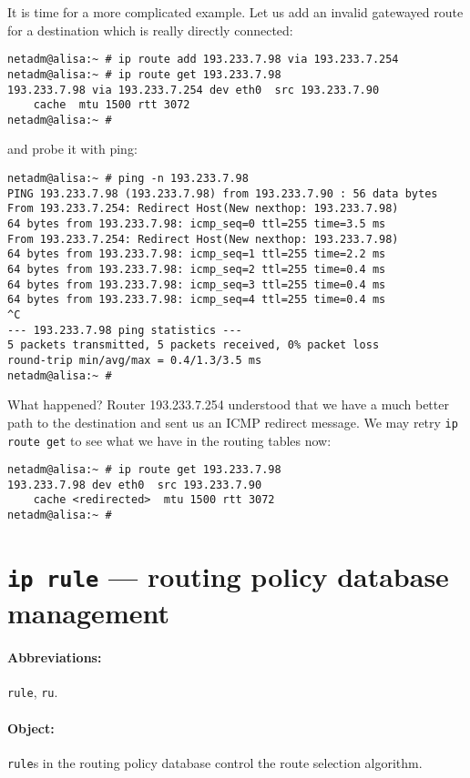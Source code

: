 It is time for a more complicated example. Let us add an invalid
gatewayed route for a destination which is really directly connected:
\begin{verbatim}
netadm@alisa:~ # ip route add 193.233.7.98 via 193.233.7.254
netadm@alisa:~ # ip route get 193.233.7.98
193.233.7.98 via 193.233.7.254 dev eth0  src 193.233.7.90
    cache  mtu 1500 rtt 3072
netadm@alisa:~ #
\end{verbatim}
and probe it with ping:
\begin{verbatim}
netadm@alisa:~ # ping -n 193.233.7.98
PING 193.233.7.98 (193.233.7.98) from 193.233.7.90 : 56 data bytes
From 193.233.7.254: Redirect Host(New nexthop: 193.233.7.98)
64 bytes from 193.233.7.98: icmp_seq=0 ttl=255 time=3.5 ms
From 193.233.7.254: Redirect Host(New nexthop: 193.233.7.98)
64 bytes from 193.233.7.98: icmp_seq=1 ttl=255 time=2.2 ms
64 bytes from 193.233.7.98: icmp_seq=2 ttl=255 time=0.4 ms
64 bytes from 193.233.7.98: icmp_seq=3 ttl=255 time=0.4 ms
64 bytes from 193.233.7.98: icmp_seq=4 ttl=255 time=0.4 ms
^C
--- 193.233.7.98 ping statistics ---
5 packets transmitted, 5 packets received, 0% packet loss
round-trip min/avg/max = 0.4/1.3/3.5 ms
netadm@alisa:~ #
\end{verbatim}
What happened? Router 193.233.7.254 understood that we have a much
better path to the destination and sent us an ICMP redirect message.
We may retry \verb|ip route get| to see what we have in the routing
tables now:
\begin{verbatim}
netadm@alisa:~ # ip route get 193.233.7.98
193.233.7.98 dev eth0  src 193.233.7.90 
    cache <redirected>  mtu 1500 rtt 3072
netadm@alisa:~ #
\end{verbatim}



\section{{\tt ip rule} --- routing policy database management}
\label{IP-RULE}

\paragraph{Abbreviations:} \verb|rule|, \verb|ru|.

\paragraph{Object:} \verb|rule|s in the routing policy database control
the route selection algorithm.

